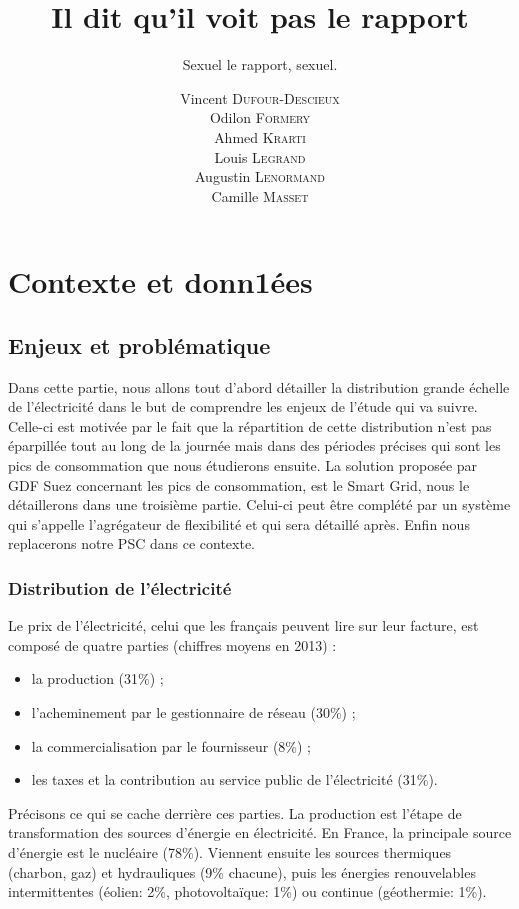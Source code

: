 \documentclass[10pt]{article}
\title{Il dit qu'il voit pas le rapport}
\subtitle{Sexuel le rapport, sexuel.}
\author{ Vincent \textsc{Dufour-Descieux} \\ Odilon \textsc{Formery} \\ Ahmed \textsc{Krarti} \\ Louis \textsc{Legrand} \\ Augustin \textsc{Lenormand} \\   Camille \textsc{Masset} }
\begin{document}
\maketitle

\section{Contexte et donn1ées}

	\subsection{Enjeux et probl\'ematique}
	
		Dans cette partie, nous allons tout d’abord détailler la distribution grande échelle de l’électricité dans le but de comprendre les enjeux de l’étude qui va suivre. Celle-ci est motivée par le fait que la répartition de cette distribution n’est pas éparpillée tout au long de la journée mais dans des périodes précises qui sont les pics de consommation que nous étudierons ensuite. La solution proposée par GDF Suez concernant les pics de consommation, est le Smart Grid, nous le détaillerons dans une troisième partie. Celui-ci peut être complété par un système qui s’appelle l’agrégateur de flexibilité et qui sera détaillé après. Enfin nous replacerons notre PSC dans ce contexte.
	
		
		\subsubsection{Distribution de l'électricité}
		
			Le prix de l'électricité, celui que les français peuvent lire sur leur facture, est composé de quatre parties (chiffres moyens en 2013) :
			\begin{itemize}
				\item la production (31\%) ;
				\item l'acheminement par le gestionnaire de réseau (30\%) ;
				\item la commercialisation par le fournisseur (8\%) ;
				\item les taxes et la contribution au service public de l'électricité (31\%).
			\end{itemize}
			
			Précisons ce qui se cache derrière ces parties.
			La production est l'étape de transformation des sources d'énergie en électricité.
			En France, la principale source d'énergie est le nucléaire (78\%). Viennent ensuite les sources thermiques (charbon, gaz) et hydrauliques (9\% chacune), puis les énergies renouvelables intermittentes (éolien: 2\%, photovoltaïque: 1\%) ou continue (géothermie: 1\%).
			
\end{document}
